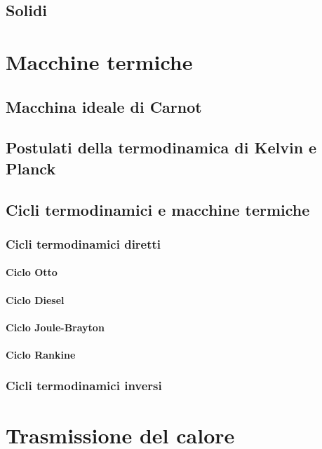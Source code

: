 \section{Solidi}

\chapter{Macchine termiche}\label{thermodynamics:thermal_machines}
\section{Macchina ideale di Carnot}
\section{Postulati della termodinamica di Kelvin e Planck}
\section{Cicli termodinamici e macchine termiche}
\subsection{Cicli termodinamici diretti}
\subsubsection{Ciclo Otto}
\subsubsection{Ciclo Diesel}
\subsubsection{Ciclo Joule-Brayton}
\subsubsection{Ciclo Rankine}
\subsection{Cicli termodinamici inversi}

\chapter{Trasmissione del calore}
